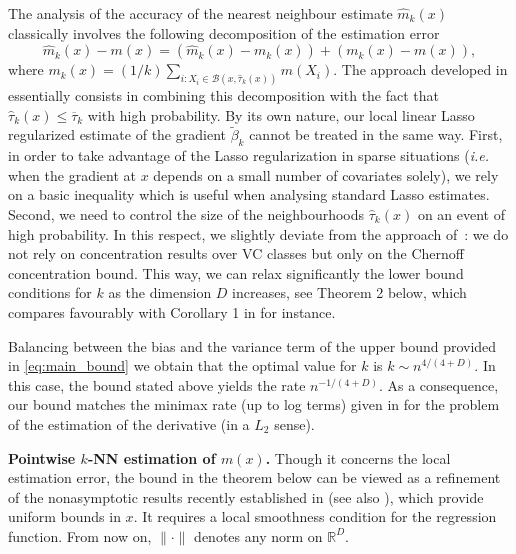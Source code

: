 The analysis of the accuracy of the nearest neighbour estimate $\hat m_k(x)$ classically involves the following decomposition of the estimation error
\begin{equation}\label{decomp_bias_var}
 \hat {m}_{k} (x)   - m (x) = \left( \hat {m}_{k}(x)  -   m_{k}(x)   \right) + \left(m_{k}(x)   - m(x)\right),
\end{equation}
where
$ m_{k}(x)  = (1/k)  \sum_{i : X_i \in \mathcal{B}(x, \hat{\tau}_k(x))} m(X_i)$. The approach developed in \cite{jiangNonAsymptoticUniformRates2019} essentially consists in combining this decomposition with the fact that $ \hat{\tau}_k(x)\leq \overline \tau _k $ with high probability. By its own nature, our local linear Lasso regularized estimate of the gradient $\tilde \beta_k$ cannot be treated in the same way. First, in order to take advantage of the Lasso regularization in sparse situations  (\textit{i.e.} when the gradient at $x$ depends on a small number of covariates solely), we rely on a basic inequality \cite[Lemma 11.1]{hastieStatisticalLearningSparsity2015} which is useful when analysing standard Lasso estimates. Second, we need to control the size of the neighbourhoods $\hat{\tau}_k(x)$ on an event of high probability. In this respect, we slightly deviate from the approach of~\cite{jiangNonAsymptoticUniformRates2019}: we do not rely on concentration results over VC classes but only on the Chernoff concentration bound. This way, we can relax significantly the lower bound conditions for $k$ as the dimension $D$ increases, see Theorem 2 below, which compares favourably with Corollary 1 in \cite{jiangNonAsymptoticUniformRates2019} for instance.


Balancing between the bias and the variance term of the upper bound provided in \eqref{eq:main_bound} we obtain that the optimal value for $k$ is $k\sim n^{4/(4+D)}$. In this case, the bound stated above yields the rate $n^{-1/(4+D)}$. As a consequence, our bound matches the minimax rate (up to log terms) given in \cite{stoneOptimalGlobalRates1982} for the problem of the estimation of the derivative (in a $L_2$ sense).
\medskip

{\bf Pointwise $k$-NN estimation of $m(x)$.}
Though it concerns the local estimation error, the bound  in the theorem below can be viewed as a refinement of the nonasymptotic results recently established in \cite{jiangNonAsymptoticUniformRates2019} (see also \cite{kpotufeKNNRegressionAdapts2011}), which provide uniform bounds in $x$. It requires a local smoothness condition for the regression function. From now on, $\| \cdot\|$ denotes any norm on $\mathbb{R}^D$.

